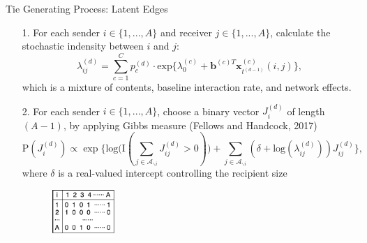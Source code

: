 \documentclass[10pt]{beamer}
\theoremstyle{definition}
\theoremstyle{remark}
\begin{document}
\begin{frame}{Tie Generating Process: Latent Edges}
		\begin{itemize}
		\item [1.] For each sender $i \in \{1,...,A\}$ and receiver $j \in \{1,...,A\}$, calculate the stochastic indensity between $i$ and $j$:
		\footnotesize
			\begin{equation*}\lambda^{(d)}_{ij}=\sum\limits_{c=1}^{C} p^{(d)}_c
		\cdot  \mbox{exp}\Big\{\lambda^{(c)}_0 + \boldsymbol{b}^{(c)T}\boldsymbol{x}^{(c)}_{t^{(d-1)}}(i, j)\Big\},	\end{equation*}\normalsize
		which is a mixture of contents, baseline interaction rate, and network effects.\\ \vspace{0.4cm}
		\item[2.] For each sender $i \in \{1,...,A\}$, choose a binary vector $J^{(d)}_i$ of length $(A-1)$, by applying Gibbs measure (Fellows and Handcock, 2017) 
		\footnotesize
		\begin{equation*} \text{P}(J_i^{(d)}) \propto \exp\Big\{ \mbox{log}\big(\text{I}( \sum_{j \in \mathcal{A}_{\backslash i}} J^{(d)}_{ij} > 0 )\big) + \sum_{j \in \mathcal{A}_{\backslash i}} (\delta+\mbox{log}(\lambda_{ij}^{(d)}))J_{ij}^{(d)} \Big\},
		\end{equation*}
		\normalsize
		where $\delta$ is a real-valued intercept controlling the recipient size\\ \vspace{0.1cm}
 \begin{figure}
 	\includegraphics[width=0.23\textwidth]{figures/table.pdf}
 \end{figure}	
	\end{itemize}
	\end{frame}
\end{document}
